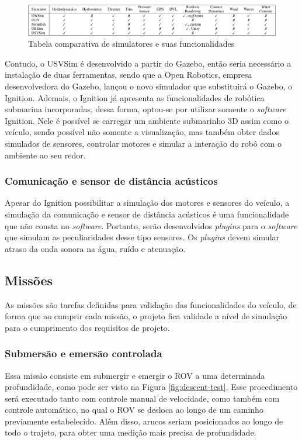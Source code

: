 \begin{figure}[h]
    \label{fig:simulators-comparison}
    \caption{Tabela comparativa de simulatores e suas funcionalidades}
    \centering
    \includegraphics[width=1\textwidth]{images/simulators_comparison.png}
\end{figure}

Contudo, o USVSim é desenvolvido a partir do Gazebo, então seria necessário a
instalação de duas ferramentas, sendo que a Open Robotics, empresa desenvolvedora do Gazebo, lançou o novo simulador que substituirá o Gazebo, o
Ignition. Ademais, o Ignition já apresenta as funcionalidades de robótica
submarina incorporadas, dessa forma, optou-se por utilizar somente o \textit{software} Ignition. Nele é possível se carregar um ambiente submarinho 3D assim como o veículo, sendo possível não somente a visualização, mas também obter dados simulados de sensores, controlar motores e simular a interação do robô com o ambiente ao seu redor.

\subsubsection{Comunicação e sensor de distância acústicos}
Apesar do Ignition possibilitar a simulação dos motores e sensores do veículo, a simulação da comunicação e sensor de distância acústicos é uma funcionalidade que não consta no \textit{software}. Portanto, serão desenvolvidos \textit{plugins} para o \textit{software} que simulam as peculiaridades desse tipo sensores. Os \textit{plugins} devem simular atraso da onda sonora na água, ruído e atenuação.


\subsection{Missões}

As missões são tarefas definidas para validação das funcionalidades do veículo, de forma que ao cumprir cada missão, o projeto fica validade a nível de simulação para o cumprimento dos requisitos de projeto.

\subsubsection{Submersão e emersão controlada}
Essa missão consiste em submergir e emergir o ROV a uma determinada profundidade,
como pode ser visto na Figura \ref{fig:descent-test}. Esse procedimento será executado tanto com controle manual de velocidade, como também com controle automático, no qual o ROV se desloca ao longo de um caminho previamente estabelecido. Além disso, arucos seriam posicionados ao longo de todo o trajeto, para obter uma medição mais precisa de profundidade.

